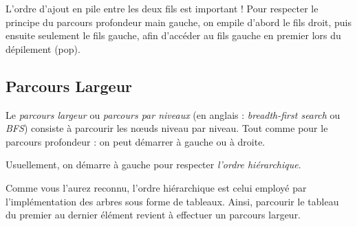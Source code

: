 \documentclass[11pt,a4paper]{article}
\begin{document}
\medskip

L'ordre d'ajout en pile entre les deux fils est important !
Pour respecter le principe du parcours profondeur main gauche, on empile d'abord le fils droit, puis ensuite seulement le fils gauche, afin d'accéder au fils gauche en premier lors du dépilement (pop).

\bigskip

\clearpage


\subsection{Parcours Largeur}

Le \textit{parcours largeur} ou \textit{parcours par niveaux} (en anglais : \textit{breadth-first search} ou \textit{BFS}) consiste à parcourir les nœuds niveau par niveau.
Tout comme pour le parcours profondeur : on peut démarrer à gauche ou à droite.

Usuellement, on démarre à gauche pour respecter \textit{l'ordre hiérarchique}.

\medskip

Comme vous l'aurez reconnu, l'ordre hiérarchique est celui employé par l'implémentation des arbres sous forme de tableaux.
Ainsi, parcourir le tableau du premier au dernier élément revient à effectuer un parcours largeur.
\end{document}
